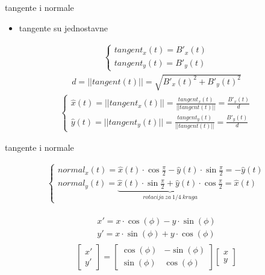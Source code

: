 \documentclass[9pt]{beamer}
\begin{document}
\begin{frame}{tangente i normale}
	\begin{itemize}
		\item tangente su jednostavne
	\end{itemize}
	\begin{align*}
	\left \{ \begin{matrix}
	tangent_x(t) = B'_x(t) \\
	tangent_y(t) = B'_y(t)
	\end{matrix} \right.
	\end{align*}
	\begin{align*}
	d = || tangent(t) || = \sqrt{B'_x(t)^2 + B'_y(t)^2}
	\end{align*}
	\begin{align*}
	\left \{ \begin{matrix}
	\hat{x}(t) = || tangent_x(t) ||
	=\frac{tangent_x(t)}{ || tangent(t) || }
	= \frac{B'_x(t)}{d} \\
	\hat{y}(t) = || tangent_y(t) ||
	= \frac{tangent_y(t)}{ || tangent(t) || }
	= \frac{B'_y(t)}{d}
	\end{matrix} \right.
	\end{align*}
\end{frame}
\begin{frame}{tangente i normale}
	
	\begin{align*}
	\left \{ \begin{array}{l}
	normal_x(t) = \hat{x}(t) \cdot \cos{\frac{\pi}{2}} - \hat{y}(t) \cdot \sin{\frac{\pi}{2}} = - \hat{y}(t) \\
	normal_y(t) = \underset{rotacija\ za\ 1/4\ kruga} {\underbrace{ \hat{x}(t) \cdot \sin{\frac{\pi}{2}} + \hat{y}(t) \cdot \cos{\frac{\pi}{2}} }} = \hat{x}(t)
	\end{array} \right.
	\end{align*}
	
	\begin{align*}
	\begin{array}{l}
	x' = x \cdot \cos(\phi) - y \cdot \sin(\phi) \\
	y' = x \cdot \sin(\phi) + y \cdot \cos(\phi)
	\end{array}
	\end{align*}
	\begin{align*}
	\begin{bmatrix}
	x' \\ y'
	\end{bmatrix}
	=
	\begin{bmatrix}
	\cos(\phi) & -\sin(\phi) \\
	\sin(\phi) & \cos(\phi)
	\end{bmatrix}
	\begin{bmatrix}
	x \\ y
	\end{bmatrix}
	\end{align*}
\end{frame}
\end{document}
